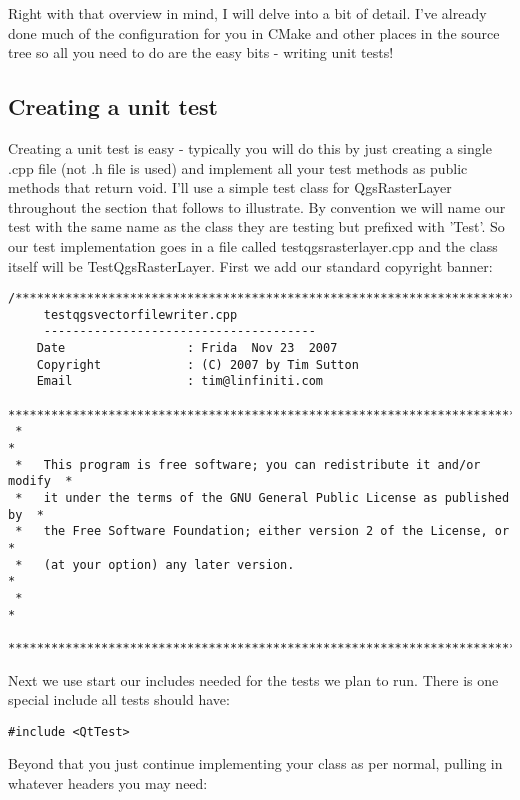 Right with that overview in mind, I will delve into a bit of detail. I've
already done much of the configuration for you in CMake and other places in the
source tree so all you need to do are the easy bits - writing unit tests!

\subsection{Creating a unit test}
Creating a unit test is easy - typically you will do this by just creating a
single .cpp file (not .h file is used) and implement all your test methods as
public methods that return void. I'll use a simple test class for
QgsRasterLayer throughout the section that follows to illustrate. By convention
we will name our test with the same name as the class they are testing but
prefixed with 'Test'.  So our test implementation goes in a file called
testqgsrasterlayer.cpp and the class itself will be TestQgsRasterLayer. First
we add our standard copyright banner:

\begin{verbatim}
/***************************************************************************
     testqgsvectorfilewriter.cpp
     --------------------------------------
    Date                 : Frida  Nov 23  2007
    Copyright            : (C) 2007 by Tim Sutton
    Email                : tim@linfiniti.com
 ***************************************************************************
 *                                                                         *
 *   This program is free software; you can redistribute it and/or modify  *
 *   it under the terms of the GNU General Public License as published by  *
 *   the Free Software Foundation; either version 2 of the License, or     *
 *   (at your option) any later version.                                   *
 *                                                                         *
 ***************************************************************************/
\end{verbatim}

Next we use start our includes needed for the tests we plan to run. There is 
one special include all tests should have:

\begin{verbatim}
#include <QtTest>
\end{verbatim}

Beyond that you just continue implementing your class as per normal, pulling 
in whatever headers you may need:

